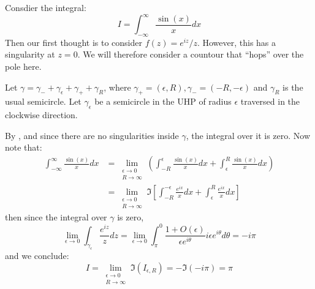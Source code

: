 \documentclass[../Main.tex]{subfiles}
\begin{document}
\begin{example}
    Consdier the integral:
    \begin{equation*}
        I = \int_{-\infty}^{\infty} \frac{\sin(x)}{x} dx
    \end{equation*}
    Then our first thought is to consider $f(z) = e^{iz} / z$. However, this has a singularity at $z = 0$. We will therefore consider a countour that ``hops'' over the pole here.
    
    Let $\gamma = \gamma_- + \gamma_\epsilon + \gamma_+ + \gamma_R$, where $\gamma_+ = (\epsilon, R), \gamma_- = (-R, -\epsilon)$ and $\gamma_R$ is the usual semicircle. Let $\gamma_\epsilon$ be a semicircle in the UHP of radius $\epsilon$ traversed in the clockwise direction.

    By , and since there are no singularities inside $\gamma$, the integral over it is zero. Now note that:
    \begin{align*}
        \int_{-\infty}^{\infty} \frac{\sin(x)}{x} dx &= \lim_{\substack{\epsilon \to 0\\R \to \infty}} \left(\int_{-R}^{\epsilon} \frac{\sin(x)}{x} dx + \int_{\epsilon}^{R} \frac{\sin(x)}{x} dx \right) \\
        &= \lim_{\substack{\epsilon \to 0\\R \to \infty}} \Im \left[\int_{-R}^{-\epsilon} \frac{e^{ix}}{x} dx + \int_{\epsilon}^{R} \frac{e^{ix}}{x} dx \right]
    \end{align*}
    then since the integral over $\gamma$ is zero,
    \begin{equation*}
        \lim_{\epsilon \to 0} \int_{\gamma_\epsilon} \frac{e^{iz}}{z} dz = \lim_{\epsilon \to 0} \int_{\pi}^{0} \frac{1 + O(\epsilon)}{\epsilon e^{i\theta}} i \epsilon e^{i\theta} d\theta = -i\pi
    \end{equation*}
    and we conclude:
    \begin{equation*}
        I = \lim_{\substack{\epsilon \to 0\\R \to \infty}} \Im(I_{\epsilon, R}) = -\Im(-i\pi) = \pi
    \end{equation*}
\end{example}
\end{document}
